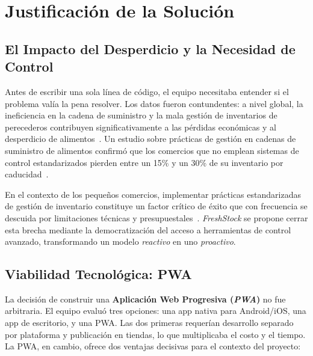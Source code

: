 \documentclass[journal]{IEEEtran}
\newcommand{\app}{\textit{FreshStock}}
\newcommand{\pwa}{\textit{PWA}}
\begin{document}
	
	
	\section{Justificaci\'{o}n de la Soluci\'{o}n}
	\label{sec:justificacion}
	
	\subsection{El Impacto del Desperdicio y la Necesidad de Control}
	\label{subsec:impacto}
	
	Antes de escribir una sola l\'{i}nea de c\'{o}digo, el equipo
	necesitaba entender si el problema val\'{i}a la pena resolver. Los
	datos fueron contundentes: a nivel global, la ineficiencia en la
	cadena de suministro y la mala gesti\'{o}n de inventarios de
	perecederos contribuyen significativamente a las p\'{e}rdidas
	econ\'{o}micas y al desperdicio de alimentos~\cite{FAO:2019}.
	Un estudio sobre pr\'{a}cticas de gesti\'{o}n en cadenas de
	suministro de alimentos confirm\'{o} que los comercios que no
	emplean sistemas de control estandarizados pierden entre un 15\%
	y un 30\% de su inventario por caducidad~\cite{Probst:2018}.
	
	En el contexto de los peque\~{n}os comercios, implementar
	pr\'{a}cticas estandarizadas de gesti\'{o}n de inventario
	constituye un factor cr\'{i}tico de \'{e}xito que con frecuencia
	se descuida por limitaciones t\'{e}cnicas y
	presupuestales~\cite{PMI:2019}. \app{} se propone cerrar esta
	brecha mediante la democratizaci\'{o}n del acceso a herramientas
	de control avanzado, transformando un modelo \emph{reactivo} en
	uno \emph{proactivo}.
	
	\subsection{Viabilidad Tecnol\'{o}gica: PWA}
	\label{subsec:pwa}
	
	La decisi\'{o}n de construir una \textbf{Aplicaci\'{o}n Web
		Progresiva (\pwa{})} no fue arbitraria. El equipo
	evalu\'{o} tres opciones: una app nativa para Android/iOS, una
	app de escritorio, y una PWA. Las dos primeras requer\'{i}an
	desarrollo separado por plataforma y publicaci\'{o}n en tiendas,
	lo que multiplicaba el costo y el tiempo. La PWA, en cambio,
	ofrece dos ventajas decisivas para el contexto del proyecto:
	
\end{document}

